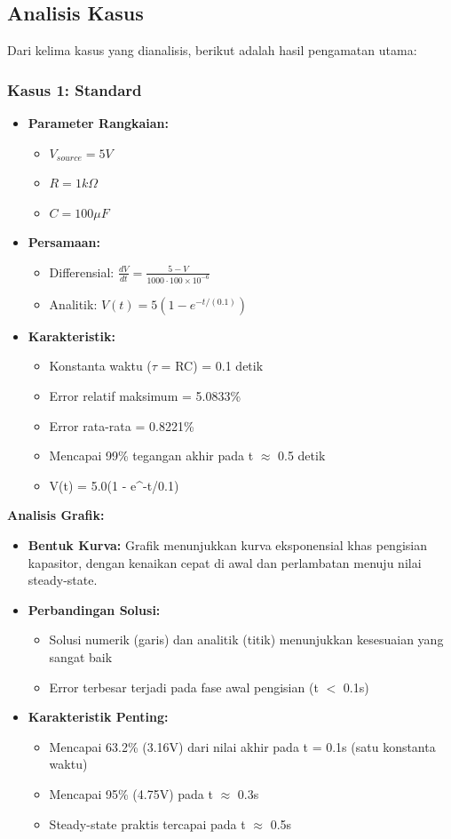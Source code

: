 \documentclass[conference]{IEEEtran}
\begin{document}
\subsection{Analisis Kasus}
Dari kelima kasus yang dianalisis, berikut adalah hasil pengamatan utama:

\subsubsection{Kasus 1: Standard}
\begin{itemize}
\item \textbf{Parameter Rangkaian:}
  \begin{itemize}
  \item $V_{source} = 5V$
  \item $R = 1k\Omega$
  \item $C = 100\mu F$
  \end{itemize}
\item \textbf{Persamaan:}
  \begin{itemize}
  \item Differensial: $\frac{dV}{dt} = \frac{5 - V}{1000 \cdot 100\times10^{-6}}$
  \item Analitik: $V(t) = 5(1 - e^{-t/(0.1)})$
  \end{itemize}
\item \textbf{Karakteristik:}
  \begin{itemize}
  \item Konstanta waktu ($\tau$ = RC) = 0.1 detik
  \item Error relatif maksimum = 5.0833\%
  \item Error rata-rata = 0.8221\%
  \item Mencapai 99\% tegangan akhir pada t $\approx$ 0.5 detik
  \item V(t) = 5.0(1 - e^{-t/0.1})
  \end{itemize}
\end{itemize}

\textbf{Analisis Grafik:}
\begin{itemize}
\item \textbf{Bentuk Kurva:} Grafik menunjukkan kurva eksponensial khas pengisian kapasitor, dengan kenaikan cepat di awal dan perlambatan menuju nilai steady-state.
\item \textbf{Perbandingan Solusi:} 
  \begin{itemize}
  \item Solusi numerik (garis) dan analitik (titik) menunjukkan kesesuaian yang sangat baik
  \item Error terbesar terjadi pada fase awal pengisian (t $<$ 0.1s)
  \end{itemize}
\item \textbf{Karakteristik Penting:}
  \begin{itemize}
  \item Mencapai 63.2\% (3.16V) dari nilai akhir pada t = 0.1s (satu konstanta waktu)
  \item Mencapai 95\% (4.75V) pada t $\approx$ 0.3s
  \item Steady-state praktis tercapai pada t $\approx$ 0.5s
  \end{itemize}
\end{itemize}
\end{document}
